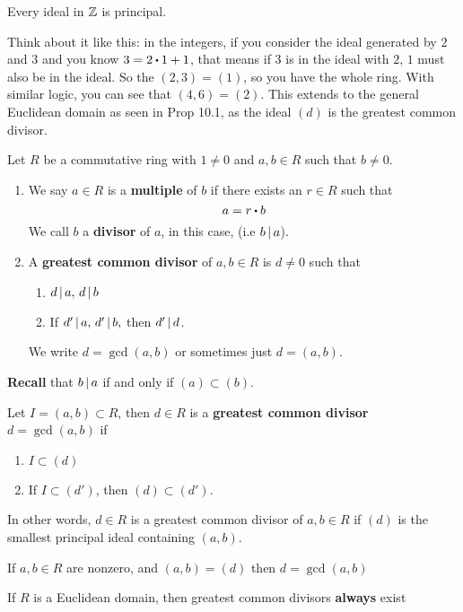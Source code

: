 \documentclass[../Main.tex]{subfiles}
\begin{document}
\begin{crl}[title= Ideals in \texorpdfstring{$\Z$}{TEXT} are principal]
	Every ideal in $\Z$ is principal.
\end{crl}
Think about it like this: in the integers, if you consider the ideal generated by $2$ and $3$ and you know $3=2\rdot 1+1$, that means if $3$ is in the ideal with $2$, $1$ must also be in the ideal. So the $(2,3)=(1)$, so you have the whole ring. With similar logic, you can see that $(4,6)=(2)$. This extends to the general Euclidean domain as seen in Prop 10.1, as the ideal $(d)$ is the greatest common divisor.
\begin{dfn}[title = {Multiple, Divisor, GCD}]
	Let $R$ be a commutative ring with $1\ne 0$ and $a,b\in R$ such that $b\ne 0$.
	\begin{enumerate}[label=(\arabic*)]
		\item We say $a\in R$ is a \textbf{multiple} of $b$ if there exists an $r\in R$ such that
		\[a=r\rdot b\]
		We call $b$ a \textbf{divisor} of $a$, in this case, (i.e $b \, | \, a$).
		\item A \textbf{greatest common divisor} of $a,b\in R$ is $d\ne 0$ such that
		\begin{enumerate}[label=(\roman*)]
			\item $d \, | \, a, \, d \, | \, b$
			\item If $d' \, | \, a,\, d' \, | \, b,$ then $d' \, | \, d$.
		\end{enumerate}
		We write $d=\gcd(a,b)$ or sometimes just $d=(a,b)$.
	\end{enumerate}
\end{dfn}
\textbf{Recall} that $b \, | \, a$ if and only if $(a)\subset (b)$.
\begin{dfn}[title = Ideal GCD]
	Let $I = (a,b)\subset R$, then $d\in R$ is a \textbf{greatest common divisor} $d=\gcd(a,b)$ if
	\begin{enumerate}
		\item $I\subset (d)$
		\item If $I\subset (d')$, then $(d)\subset (d')$.
	\end{enumerate}
	In other words, $d\in R$ is a greatest common divisor of $a,b\in R$ if $(d)$ is the smallest principal ideal containing $(a,b)$.
\end{dfn}
\begin{prop}
	If $a,b\in R$ are nonzero, and $(a,b)=(d)$ then $d=\gcd(a,b)$
\end{prop}	
\begin{thm}[title = GCDs exist in Euclidean domains]
	If $R$ is a Euclidean domain, then greatest common divisors \textbf{always} exist
\end{thm}
\end{document}
